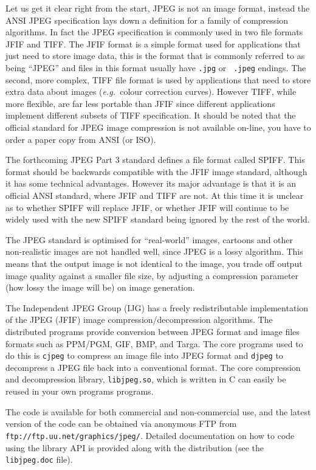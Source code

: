 \documentclass[twoside,11pt]{article}
\newcommand{\htmladdnormallink}[2]{#1}
\begin{document}
Let us get it clear right from the start, JPEG is not an image format,
instead the ANSI JPEG specification lays down a definition for a
family of compression algorithms. In fact the JPEG specification is
commonly used in two file formats JFIF and TIFF. The JFIF format is a
simple format used for applications that just need to store image
data, this is the format that is commonly referred to as being
``JPEG'' and files in this format usually have {\tt .jpg} or {\tt
.jpeg} endings. The second, more complex, TIFF file format is used by
applications that need to store extra data about images ({\em e.g.\
}colour correction curves). However TIFF, while more flexible, are far
less portable than JFIF since different applications implement
different subsets of TIFF specification. It should be noted that the
official standard for JPEG image compression is not available on-line,
you have to order a paper copy from ANSI (or ISO).

The forthcoming JPEG Part 3 standard defines a file format called
SPIFF. This format should be backwards compatible with the JFIF image
standard, although it has some technical advantages. However its major
advantage is that it is an official ANSI standard, where JFIF and TIFF
are not. At this time it is unclear as to whether SPIFF will replace
JFIF, or whether JFIF will continue to be widely used with the new
SPIFF standard being ignored by the rest of the world.

The JPEG standard is optimised for ``real-world'' images, cartoons and
other non-realistic images are not handled well, since JPEG is a lossy
algorithm. This means that the output image is not identical to the
image, you trade off output image quality against a smaller file size,
by adjusting a compression parameter (how lossy the image will be) on
image generation.

The Independent JPEG Group (IJG) has a freely redistributable
implementation of the JPEG (JFIF) image compression/decompression
algorithms. The distributed programs provide conversion between JPEG
format and image files formats such as PPM/PGM, GIF, BMP, and Targa.
The core programs used to do this is {\tt cjpeg} to compress an image
file into JPEG format and {\tt djpeg} to decompress a JPEG file back
into a conventional format. The core compression and decompression
library, {\tt libjpeg.so}, which is written in C can easily be reused
in your own programs programs.

The code is available for both commercial and non-commercial use, and
the latest version of the code can be obtained via anonymous FTP from
\htmladdnormallink{{\tt
ftp://ftp.uu.net/graphics/jpeg/}}{ftp://ftp.uu.net/graphics/jpeg/}.
Detailed documentation on how to code using the library API is
provided along with the distribution (see the {\tt libjpeg.doc} file).
\end{document}
